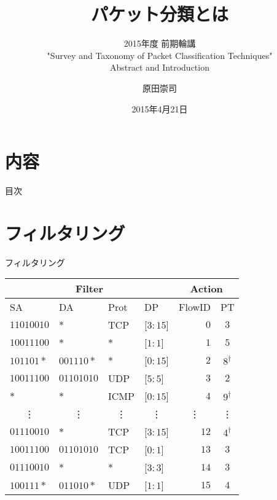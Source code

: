 \documentclass[12pt,dvipdfmx,mathserif,uplatex,aspectratio=32]{beamer}
\title{パケット分類とは}
\subtitle{2015年度 前期輪講 \\ "Survey and Taxonomy of Packet Classification Techniques" \\ Abstract and Introduction}
\author{原田崇司}
\date[]{2015年4月21日}
\institute[所属]{神奈川大学大学院 理学研究科 情報科学専攻 田中研究室}
\begin{document}
\frame{\maketitle}

\section*{内容}


\begin{frame}{目次}
  \tableofcontents
\end{frame}



\section{フィルタリング}


\begin{frame}{フィルタリング}

\begin{table}
 \begin{tabular}{|l|l|l|l||r|c|} \hline
 \multicolumn{4}{|c||}{Filter} & \multicolumn{2}{|c|}{Action} \\ \hline
 SA & DA & Prot & DP & FlowID & PT  \\ \hline
 $11010010$ & $*$        & TCP  & [$3:15$] & $0$  & $3$  \\
 $10011100$ & $*$        & $*$  & [$1:1$]  & $1$  & $5$ \\
 $101101*$  & $001110*$  & $*$  & [$0:15$] & $2$  & $8^{\dagger}$ \\
 $10011100$ & $01101010$ & UDP  & [$5:5$]  & $3$  & $2$ \\
 $*$        & $*$        & ICMP & [$0:15$] & $4$  & $9^{\dagger}$ \\
 \multicolumn{1}{|c}{\vdots} & \multicolumn{1}{|c}{\vdots} & \multicolumn{1}{|c}{\vdots} & \multicolumn{1}{|c||}{\vdots} & \multicolumn{1}{|c}{\vdots} & \multicolumn{1}{|c|}{\vdots} \\
 $01110010$ & $*$        & TCP  & [$3:15$] & $12$ & $4^{\dagger}$\\
 $10011100$ & $01101010$ & TCP  & [$0:1$]  & $13$ & $3$ \\
 $01110010$ & $*$        & $*$  & [$3:3$]  & $14$ & $3$ \\
 $100111*$  & $011010*$  & UDP  & [$1:1$]  & $15$ & $4$ \\ \hline
 \end{tabular}
\end{table}

\end{frame}
\end{document}
